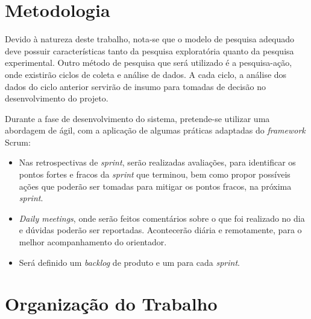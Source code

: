 \section{Metodologia}
\label{sub:metodologia}

Devido à natureza deste trabalho, nota-se que o modelo de pesquisa adequado deve possuir características tanto da pesquisa exploratória quanto da pesquisa experimental. Outro método de pesquisa que será utilizado é a pesquisa-ação, onde existirão ciclos de coleta e análise de dados. A cada ciclo, a análise dos dados do ciclo anterior servirão de insumo para tomadas de decisão no desenvolvimento do projeto.

Durante a fase de desenvolvimento do sistema, pretende-se utilizar uma abordagem de ágil, com a aplicação de algumas práticas adaptadas do \textit{framework} Scrum:

\begin{itemize}
    \item Nas retrospectivas de \textit{sprint}, serão realizadas avaliações, para identificar os pontos fortes e fracos da \textit{sprint} que terminou, bem como propor possíveis ações que poderão ser tomadas para mitigar os pontos fracos, na próxima \textit{sprint}.
    \item \textit{Daily meetings}, onde serão feitos comentários sobre o que foi realizado no dia e dúvidas poderão ser reportadas. Acontecerão diária e remotamente, para o melhor acompanhamento do orientador.
    \item Será definido um \textit{backlog} de produto e um para cada \textit{sprint}.
\end{itemize}

\section{Organização do Trabalho}
\label{sec:organização_do_trabalho}
